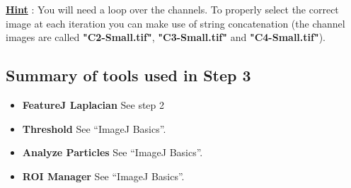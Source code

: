 \textbf{\underline{Hint}} : You will need a loop over the channels. To properly select the correct image at each iteration you can make use of string concatenation (the channel images are called \textbf{"C2-Small.tif"}, \textbf{"C3-Small.tif"} and \textbf{"C4-Small.tif"}).



\subsection{Summary of tools used in Step 3}

\begin{itemize}
\item\textbf{FeatureJ Laplacian} See step 2

\item\textbf{Threshold} See ``ImageJ Basics''.
\item\textbf{Analyze Particles} See ``ImageJ Basics''.
\item\textbf{ROI Manager} See ``ImageJ Basics''.

\end{itemize}

\newpage